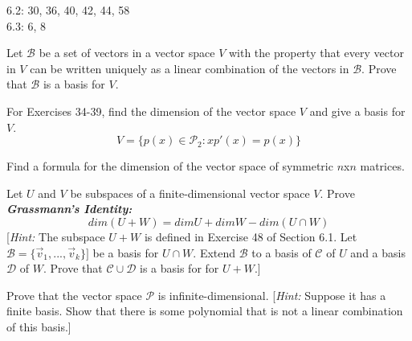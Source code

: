 \documentclass[11pt,letterpaper,boxed]{pset}
\begin{document}
    \begin{center}
        6.2: 30, 36, 40, 42, 44, 58 \\
        6.3: 6, 8
    \end{center}
    
    
    \begin{problem}[6.2 \#30]
    Let $\mathscr{B}$ be a set of vectors in a vector space $V$ with
    the property that every vector in $V$ can be written uniquely as a linear combination of the vectors in $\mathscr{B}$. Prove that $\mathscr{B}$ is a basis for $V$.
    \end{problem}
    \newpage
    
    
    \begin{problem}[6.2 \#36]
    For Exercises 34-39, find the dimension of the vector space $V$ and give a basis for $V$.
    \[ V=\{p(x) \in \mathscr{P}_2: xp'(x)=p(x) \} \]
    \end{problem}
    \newpage
    
    
    \begin{problem}[6.2 \#40]
    Find a formula for the dimension of the vector space of symmetric $n$x$n$ matrices.
    \end{problem}
    \newpage
    
    
    \begin{problem}[6.2 \#42]
    Let $U$ and $V$ be subspaces of a finite-dimensional vector space $V$. Prove \textbf{\textit{Grassmann's Identity:}}
    \[ dim(U+W)=dimU+dimW-dim(U \cap W) \]
    [\textit{Hint:} The subspace $U+W$ is defined in Exercise 48 of Section 6.1. Let $\mathscr{B}= \{\Vec{v}_1,...,\Vec{v}_k\}]$ be a basis for $U \cap W$. Extend $\mathscr{B}$ to a basis of $\mathscr{C}$ of $U$ and a basis $\mathscr{D}$ of $W$. Prove that $\mathscr{C} \cup \mathscr{D}$ is a basis for for $U+W$.]
    \end{problem}
    \newpage
    
    
    \begin{problem}[6.2 \#44]
    Prove that the vector space $\mathscr{P}$ is infinite-dimensional. [\textit{Hint:} Suppose it has a finite basis. Show that there is some polynomial that is not a linear combination of this basis.]
    \end{problem}
    \newpage
    
\end{document}
